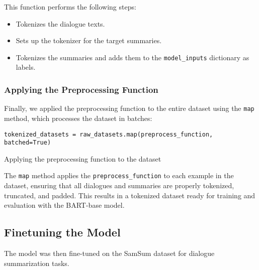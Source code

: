 This function performs the following steps:
\begin{itemize}
    \item Tokenizes the dialogue texts.
    \item Sets up the tokenizer for the target summaries.
    \item Tokenizes the summaries and adds them to the \texttt{model\_inputs} dictionary as labels.
\end{itemize}

\subsubsection{Applying the Preprocessing Function}

Finally, we applied the preprocessing function to the entire dataset using the \texttt{map} method, which processes the dataset in batches:

\begin{listing}[H]
\begin{verbatim}
tokenized_datasets = raw_datasets.map(preprocess_function, batched=True)
\end{verbatim}
\caption{Applying the preprocessing function to the dataset}
\label{listing:Tokenized_Datasets}
\end{listing}

The \texttt{map} method applies the \texttt{preprocess\_function} to each example in the dataset, ensuring that all dialogues and summaries are properly tokenized, truncated, and padded. This results in a tokenized dataset ready for training and evaluation with the BART-base model.

    \subsection{Finetuning the Model}
        The model was then fine-tuned on the SamSum dataset for dialogue summarization tasks.
        \begin{table}[h!]
            \centering
            \caption{Training and validation results across epochs.}
            \label{tab:training_results}
        \end{table}
